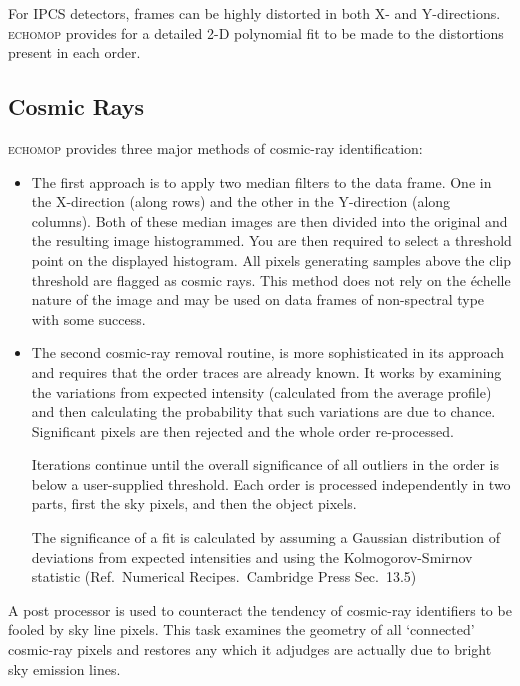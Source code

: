 \documentclass[twoside,11pt,nolof]{starlink}
\newcommand{\mlabel}[1]{\xlabel{#1}\label{#1}}
\newcommand{\myindex}[1]{\index{#1}}
\begin{document}
For IPCS detectors, frames can be highly distorted in both X- and
Y-directions.  \textsc{echomop} provides for a detailed 2-D polynomial fit to be
made to the distortions present in each order.


\subsection{\mlabel{cosmic_rays}Cosmic Rays}
\myindex{Cosmic rays!location of}

\textsc{echomop} provides three major methods of cosmic-ray identification:

\begin{itemize}

\item The first approach is to apply two median filters to the data
      frame. One in the X-direction (along rows) and the other in the
      Y-direction (along columns). Both of these median images are then
      divided into the original and the resulting image histogrammed. You
      are then required to select a threshold point on the displayed
      histogram. All pixels generating samples above the clip threshold are
      flagged as cosmic rays. This method does not rely on the \'{e}chelle
      nature of the image and may be used on data frames of non-spectral
      type with some success.

\item The second cosmic-ray removal routine,  is more sophisticated in
      its approach and requires that the order traces are already known. It
      works by examining the variations from expected intensity (calculated
      from the average profile) and then calculating the probability that
      such variations are due to chance. Significant pixels are then
      rejected and the whole order re-processed.

      Iterations continue until the overall significance of all outliers in
      the order is below a user-supplied threshold. Each order is processed
      independently in two parts,  first the sky pixels,  and then the
      object pixels.

      The significance of a fit is calculated by assuming a Gaussian
      distribution of deviations from expected intensities and using the
      Kolmogorov-Smirnov statistic (Ref.\ Numerical Recipes.\ Cambridge Press
      Sec.~13.5)

\end{itemize}

A post processor is used to counteract the tendency of cosmic-ray
identifiers to be fooled by sky line pixels. This task examines the
geometry of all `connected' cosmic-ray pixels and restores any which it
adjudges are actually due to bright sky emission lines.
\myindex{Sky lines}
\end{document}
